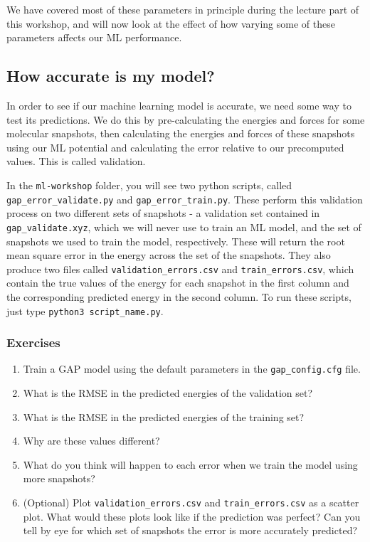 \documentclass{article}
\begin{document}
We have covered most of these parameters in principle during the lecture part of this workshop, and will now look at the effect of how varying some of these parameters affects our ML performance.

\subsection{How accurate is my model?}

In order to see if our machine learning model is accurate, we need some way to test its predictions. We do this by pre-calculating the energies and forces for some molecular snapshots, then calculating the energies and forces of these snapshots using our ML potential and calculating the error relative to our precomputed values. This is called validation.

In the \verb|ml-workshop| folder, you will see two python scripts, called \verb|gap_error_validate.py| and \verb|gap_error_train.py|. These perform this validation process on two different sets of snapshots - a validation set contained in \verb|gap_validate.xyz|, which we will never use to train an ML model, and the set of snapshots we used to train the model, respectively. These will return the root mean square error in the energy across the set of the snapshots. They also produce two files called \verb|validation_errors.csv| and \verb|train_errors.csv|, which contain the true values of the energy for each snapshot in the first column and the corresponding predicted energy in the second column. To run these scripts, just type \verb|python3 script_name.py|.

\subsubsection*{Exercises}

\begin{enumerate}
 
\item Train a GAP model using the default parameters in the \verb|gap_config.cfg| file.
\item What is the RMSE in the predicted energies of the validation set?
\item What is the RMSE in the predicted energies of the training set?
\item Why are these values different?
\item What do you think will happen to each error when we train the model using more snapshots?
\item (Optional) Plot \verb|validation_errors.csv| and \verb|train_errors.csv| as a scatter plot. What would these plots look like if the prediction was perfect? Can you tell by eye for which set of snapshots the error is more accurately predicted?

\end{enumerate}
\end{document}
